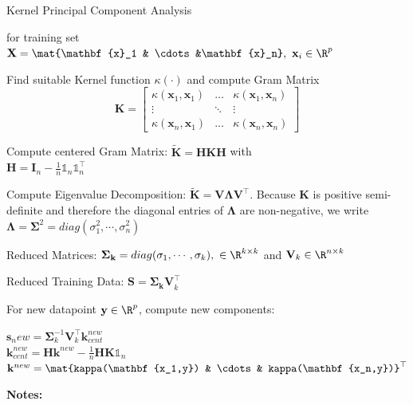 \documentclass[english]{latex4ei/latex4ei_sheet}
\begin{document}
\begin{sectionbox}
\begin{cookbox}{Kernel Principal Component Analysis}
    \item  for training set $\mathbf{X}=\mat{\mathbf{x}_1 & \cdots &\mathbf{x}_n}, \ \mathbf{x}_i\in\R^p$
	\item Find suitable Kernel function $\kappa(\cdot)$ and compute Gram Matrix
	\[
    \mathbf{K}=
    \begin{bmatrix}
    \kappa(\mathbf{x}_1,\mathbf{x}_1) & \dots  & \kappa(\mathbf{x}_1,\mathbf{x}_n) \\
    \vdots & \ddots & \vdots \\
    \kappa(\mathbf{x}_n,\mathbf{x}_1) & \dots  & \kappa(\mathbf{x}_n,\mathbf{x}_n)
    \end{bmatrix}
    \]
	\item Compute centered Gram Matrix: $\mathbf{\tilde{K}=HKH}$ with\\ $\mathbf{H=I}_n-\frac{1}{n}\mathds{1}_n\mathds{1}_n^{\top}$
	\item Compute Eigenvalue Decomposition: $\mathbf{\tilde{K}=V\Lambda V^{\top}}$. Because $\mathbf{K}$ is positive semi-definite and therefore the diagonal entries of $\mathbf{\Lambda}$ are non-negative, we write $\mathbf{\Lambda=\Sigma}^2=diag(\sigma_1^2, \cdots, \sigma_n^2)$
	\item Reduced Matrices: $\mathbf{\Sigma_k}=diag(\sigma_1,\cdots,\sigma_k),\ \in\R^{k\times k}$ and $\mathbf{V}_k\in\R^{n\times k}$
	\item Reduced Training Data: $\mathbf{S=\Sigma_kV}_k^{\top}$
	\item For new datapoint $\mathbf{y}\in\R^p$, compute new components: 
	\begin{center}
		$\mathbf{s}_new=\mathbf{\Sigma}_k^{-1}\mathbf{V}_k^{\top}\mathbf{k}_{cent}^{new}$\\
	    $\mathbf{k}_{cent}^{new}=\mathbf{Hk}_{}^{new}-\frac{1}{n}\mathbf{HK}\mathds{1}_n$\\
		$\mathbf{k}^{new}=\mat{kappa(\mathbf{x_1,y}) & \cdots & kappa(\mathbf{x_n,y})}^{\top}$
	\end{center}
\end{cookbox}
\end{sectionbox}
\textbf{Notes:}

\newpage
\end{document}
